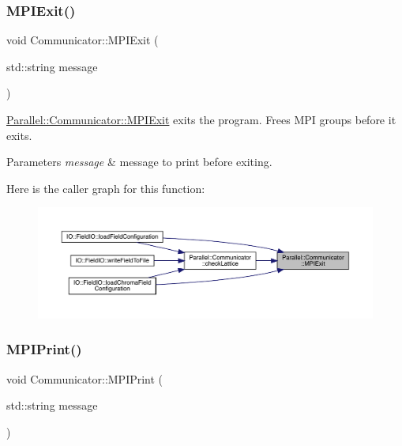 \subsubsection{\texorpdfstring{MPIExit()}{MPIExit()}}
{\footnotesize\ttfamily void Communicator\+::\+M\+P\+I\+Exit (\begin{DoxyParamCaption}\item[{std\+::string}]{message }\end{DoxyParamCaption})\hspace{0.3cm}{\ttfamily [static]}}



\mbox{\hyperlink{class_parallel_1_1_communicator_a57bb28ee8dbc4efd708a2695423778c4}{Parallel\+::\+Communicator\+::\+M\+P\+I\+Exit}} exits the program. Frees M\+PI groups before it exits. 


\begin{DoxyParams}{Parameters}
{\em message} & message to print before exiting. \\
\hline
\end{DoxyParams}
Here is the caller graph for this function\+:
\nopagebreak
\begin{figure}[H]
\begin{center}
\leavevmode
\includegraphics[width=350pt]{class_parallel_1_1_communicator_a57bb28ee8dbc4efd708a2695423778c4_icgraph}
\end{center}
\end{figure}
\mbox{\label{class_parallel_1_1_communicator_a34a1d27c0e2b2b101b97a53734dbc4f8}} 
\subsubsection{\texorpdfstring{MPIPrint()}{MPIPrint()}}
{\footnotesize\ttfamily void Communicator\+::\+M\+P\+I\+Print (\begin{DoxyParamCaption}\item[{std\+::string}]{message }\end{DoxyParamCaption})\hspace{0.3cm}{\ttfamily [static]}}



